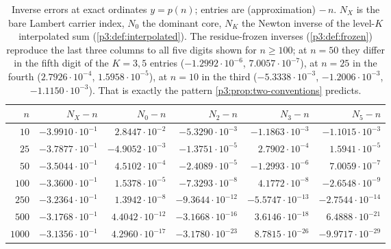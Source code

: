 \documentclass[11pt,a4paper,oneside]{book}
\theoremstyle{plain}
\theoremstyle{definition}
\theoremstyle{remark}
\begin{document}
\begin{table}[htbp]
\centering
\caption{Inverse errors at exact ordinates $y=p(n)$; entries are (approximation) $-\,n$.
$N_{X}$ is the bare Lambert carrier index, $N_{0}$ the dominant core, $N_{K}$ the Newton
inverse of the level-$K$ interpolated sum (\cref{p3:def:interpolated}).  The
residue-frozen inverses (\cref{p3:def:frozen}) reproduce the last three columns to all
five digits shown for $n\ge100$; at $n=50$ they differ in the fifth digit of the
$K=3,5$ entries ($-1.2992\cdot10^{-6}$, $7.0057\cdot10^{-7}$), at $n=25$ in the fourth
($2.7926\cdot10^{-4}$, $1.5958\cdot10^{-5}$), at $n=10$ in the third
($-5.3338\cdot10^{-3}$, $-1.2006\cdot10^{-3}$, $-1.1150\cdot10^{-3}$).  That is exactly
the pattern \cref{p3:prop:two-conventions} predicts.}
\label{p3:tab:inverse}
\small
\begin{tabular}{@{}rrrrrr@{}}
\toprule
$n$ & $N_{X}-n$ & $N_{0}-n$ & $N_{2}-n$ & $N_{3}-n$ & $N_{5}-n$\\
\midrule
$10$ & $-3.9910\cdot10^{-1}$ & $2.8447\cdot10^{-2}$ & $-5.3290\cdot10^{-3}$ & $-1.1863\cdot10^{-3}$ & $-1.1015\cdot10^{-3}$\\
$25$ & $-3.7877\cdot10^{-1}$ & $-4.9052\cdot10^{-3}$ & $-1.3751\cdot10^{-5}$ & $2.7902\cdot10^{-4}$ & $1.5941\cdot10^{-5}$\\
$50$ & $-3.5044\cdot10^{-1}$ & $4.5102\cdot10^{-4}$ & $-2.4089\cdot10^{-5}$ & $-1.2993\cdot10^{-6}$ & $7.0059\cdot10^{-7}$\\
$100$ & $-3.3600\cdot10^{-1}$ & $1.5378\cdot10^{-5}$ & $-7.3293\cdot10^{-8}$ & $4.1772\cdot10^{-8}$ & $-2.6548\cdot10^{-9}$\\
$250$ & $-3.2364\cdot10^{-1}$ & $1.3942\cdot10^{-8}$ & $-9.3644\cdot10^{-12}$ & $-5.5747\cdot10^{-13}$ & $-2.7544\cdot10^{-14}$\\
$500$ & $-3.1768\cdot10^{-1}$ & $4.4042\cdot10^{-12}$ & $-3.1668\cdot10^{-16}$ & $3.6146\cdot10^{-18}$ & $6.4888\cdot10^{-21}$\\
$1000$ & $-3.1356\cdot10^{-1}$ & $4.2960\cdot10^{-17}$ & $-3.1780\cdot10^{-23}$ & $8.7815\cdot10^{-26}$ & $-9.9717\cdot10^{-29}$\\
\bottomrule
\end{tabular}
\end{table}
\end{document}
